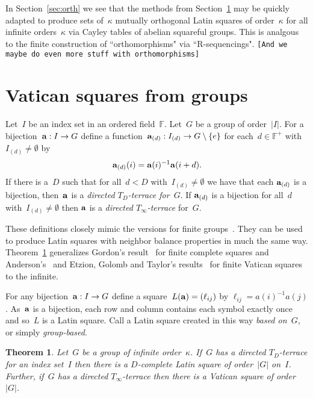 \documentclass[12pt,a4paper]{article}
\newtheorem{thm}{Theorem}[section]
\newcommand{\F}{\mathbb{F}}
\begin{document}
In Section~\ref{sec:orth} we see that the methods from Section~\ref{sec:cayley} may be quickly adapted to produce sets of~$\kappa$ mutually orthogonal Latin squares of order~$\kappa$ for all infinite orders~$\kappa$ via Cayley tables of abelian squareful groups.  This is analgous to the finite construction of ``orthomorphisms" via ``R-sequencings".  \texttt{[And we maybe do even more stuff with orthomorphisms]}  


\section{Vatican squares from groups}\label{sec:cayley}


Let~$I$ be an index set in an ordered field~$\F$.  Let~$G$ be a group of order~$|I|$.  For a bijection~${\bf a}: I \rightarrow G$ define a function~${\bf a}_{(d)}: I_{(d)} \rightarrow G \setminus \{ e \}$ for each~$d \in \F^+$ with~$I_{(d)} \neq \emptyset$ by
$${\bf a}_{(d)}(i) = {\bf a}(i)^{-1}{\bf a}(i+d).$$
If there is a~$D$ such that for all~$d < D$ with~$I_{(d)} \neq \emptyset$ we have that each ${\bf a}_{(d)}$ is a bijection, then~${\bf a}$ is a {\em directed $T_D$-terrace for~$G$}.  If ${\bf a}_{(d)}$ is a bijection for all~$d$  with~$I_{(d)} \neq \emptyset$ then ${\bf a}$ is  a {\em directed $T_{\infty}$-terrace} for~$G$.

These definitions closely mimic the versions for finite groups~\cite{Anderson90}.   They can be used to produce Latin squares with neighbor balance properties in much the same way.  Theorem~\ref{th:terrace2square} generalizes Gordon's result~\cite{Gordon61} for finite complete squares and Anderson's~\cite{Anderson90} and Etzion, Golomb and Taylor's results~\cite{EGT89} for finite Vatican squares to the infinite.  

For any bijection~${\bf a}: I \rightarrow G$ define a square~$L({\bf a}) = (\ell_{ij})$ by $\ell_{ij} = a(i)^{-1}a(j)$.   As~${\bf a}$ is a bijection, each row and column contains each symbol exactly once and so~$L$ is a Latin square.  Call a Latin square created in this way {\em based on~$G$}, or simply {\em group-based}.

\begin{thm}\label{th:terrace2square}
Let~$G$ be a group of infinite order~$\kappa$.  If~$G$ has a directed $T_{D}$-terrace for an index set~$I$ then there is a $D$-complete Latin square of order~$|G|$ on~$I$.  Further, if~$G$ has a directed $T_{\infty}$-terrace then there is a Vatican square of order~$|G|$.
\end{thm}
\end{document}
